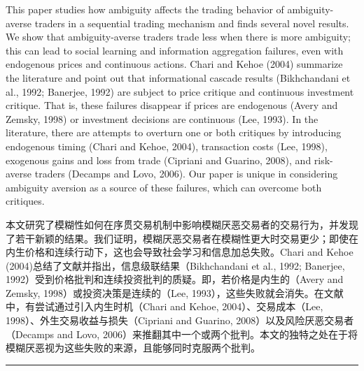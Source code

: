 \documentclass[12pt,a4paper]{article}
\newenvironment{original}{%
  \par\vspace{4pt}\noindent%
  \color{black}%
  \ignorespaces
}{%
  \par\vspace{2pt}%
}
\newenvironment{translation}{%
  \par\vspace{2pt}\noindent%
  \color{transblue}%
  \ignorespaces
}{%
  \par\vspace{4pt}\hrule\vspace{6pt}%
}
\begin{document}
\begin{original}
This paper studies how ambiguity affects the trading behavior of ambiguity-averse traders in a sequential trading mechanism and finds several novel results. We show that ambiguity-averse traders trade less when there is more ambiguity; this can lead to social learning and information aggregation failures, even with endogenous prices and continuous actions. Chari and Kehoe (2004) summarize the literature and point out that informational cascade results (Bikhchandani et al., 1992; Banerjee, 1992) are subject to price critique and continuous investment critique. That is, these failures disappear if prices are endogenous (Avery and Zemsky, 1998) or investment decisions are continuous (Lee, 1993). In the literature, there are attempts to overturn one or both critiques by introducing endogenous timing (Chari and Kehoe, 2004), transaction costs (Lee, 1998), exogenous gains and loss from trade (Cipriani and Guarino, 2008), and risk-averse traders (Decamps and Lovo, 2006). Our paper is unique in considering ambiguity aversion as a source of these failures, which can overcome both critiques.
\end{original}
\begin{translation}
本文研究了模糊性如何在序贯交易机制中影响模糊厌恶交易者的交易行为，并发现了若干新颖的结果。我们证明，模糊厌恶交易者在模糊性更大时交易更少；即使在内生价格和连续行动下，这也会导致社会学习和信息加总失败。Chari and Kehoe (2004)总结了文献并指出，信息级联结果（Bikhchandani et al., 1992; Banerjee, 1992）受到价格批判和连续投资批判的质疑。即，若价格是内生的（Avery and Zemsky, 1998）或投资决策是连续的（Lee, 1993），这些失败就会消失。在文献中，有尝试通过引入内生时机（Chari and Kehoe, 2004）、交易成本（Lee, 1998）、外生交易收益与损失（Cipriani and Guarino, 2008）以及风险厌恶交易者（Decamps and Lovo, 2006）来推翻其中一个或两个批判。本文的独特之处在于将模糊厌恶视为这些失败的来源，且能够同时克服两个批判。
\end{translation}
\end{document}
